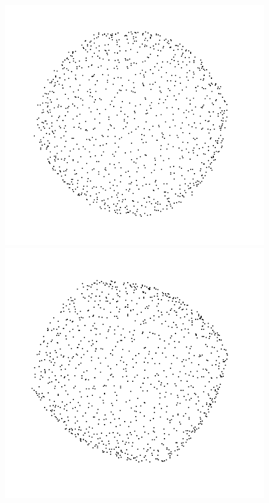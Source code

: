 \documentclass{beamer}
\begin{document}
\begin{frame}
\begin{figure}
        \includegraphics[scale=0.15]{img/sphere-025-05-2}
        \includegraphics[scale=0.15]{img/sphere-025-05-15}
    \end{figure}


\end{frame}
\end{document}
